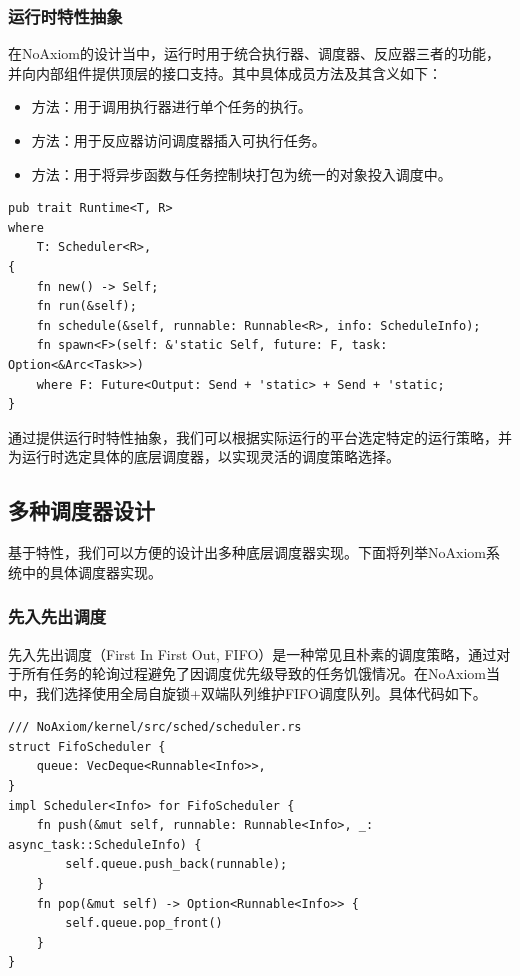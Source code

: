 \documentclass{article}
\begin{document}
\subsubsection{运行时特性抽象}

在NoAxiom的设计当中，运行时用于统合执行器、调度器、反应器三者的功能，并向内部组件提供顶层的接口支持。其中具体成员方法及其含义如下：

\begin{itemize}
    \item {}方法：用于调用执行器进行单个任务的执行。
    \item {}方法：用于反应器访问调度器插入可执行任务。
    \item {}方法：用于将异步函数与任务控制块打包为统一的对象投入调度中。
\end{itemize}

\begin{lstlisting}
pub trait Runtime<T, R>
where
    T: Scheduler<R>,
{
    fn new() -> Self;
    fn run(&self);
    fn schedule(&self, runnable: Runnable<R>, info: ScheduleInfo);
    fn spawn<F>(self: &'static Self, future: F, task: Option<&Arc<Task>>)
    where F: Future<Output: Send + 'static> + Send + 'static;
}
\end{lstlisting}

通过提供运行时特性抽象，我们可以根据实际运行的平台选定特定的运行策略，并为运行时选定具体的底层调度器，以实现灵活的调度策略选择。

\subsection{多种调度器设计}

基于特性，我们可以方便的设计出多种底层调度器实现。下面将列举NoAxiom系统中的具体调度器实现。

\subsubsection{先入先出调度}

先入先出调度（First In First Out, FIFO）是一种常见且朴素的调度策略，通过对于所有任务的轮询过程避免了因调度优先级导致的任务饥饿情况。在NoAxiom当中，我们选择使用全局自旋锁+双端队列维护FIFO调度队列。具体代码如下。

\begin{lstlisting}
/// NoAxiom/kernel/src/sched/scheduler.rs
struct FifoScheduler {
    queue: VecDeque<Runnable<Info>>,
}
impl Scheduler<Info> for FifoScheduler {
    fn push(&mut self, runnable: Runnable<Info>, _: async_task::ScheduleInfo) {
        self.queue.push_back(runnable);
    }
    fn pop(&mut self) -> Option<Runnable<Info>> {
        self.queue.pop_front()
    }
}
\end{lstlisting}
\end{document}
